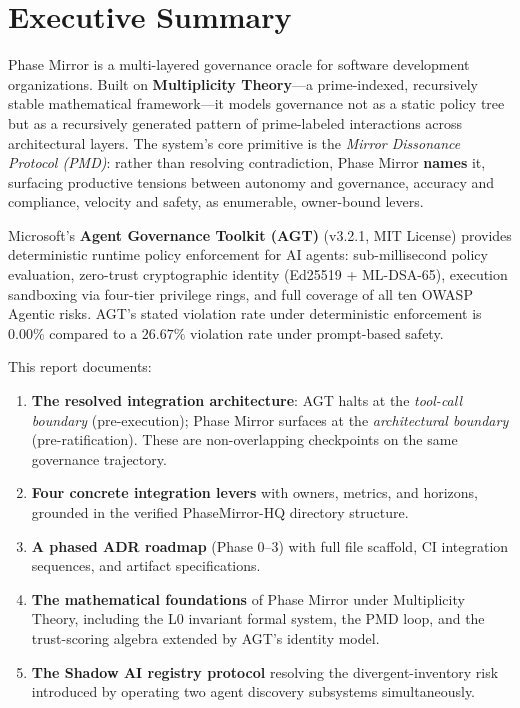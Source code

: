 \documentclass[12pt,a4paper]{article}
\theoremstyle{definition}
\theoremstyle{remark}
\begin{document}
\newpage
\tableofcontents

\section*{Executive Summary}

Phase Mirror is a multi-layered governance oracle for software development
organizations. Built on \textbf{Multiplicity Theory}---a prime-indexed,
recursively stable mathematical framework---it models governance not as a static
policy tree but as a recursively generated pattern of prime-labeled interactions
across architectural layers. The system's core primitive is the \emph{Mirror
Dissonance Protocol (PMD)}: rather than resolving contradiction, Phase Mirror
\textbf{names} it, surfacing productive tensions between autonomy and governance,
accuracy and compliance, velocity and safety, as enumerable, owner-bound levers.

Microsoft's \textbf{Agent Governance Toolkit (AGT)} (v3.2.1, MIT License) provides
deterministic runtime policy enforcement for AI agents: sub-millisecond
policy evaluation, zero-trust cryptographic identity (Ed25519 + ML-DSA-65),
execution sandboxing via four-tier privilege rings, and full coverage of all
ten OWASP Agentic risks. AGT's stated violation rate under deterministic
enforcement is $0.00\%$ compared to a $26.67\%$ violation rate under prompt-based
safety.

This report documents:
\begin{enumerate}[leftmargin=2em]
  \item \textbf{The resolved integration architecture}: AGT halts at the
    \emph{tool-call boundary} (pre-execution); Phase Mirror surfaces at the
    \emph{architectural boundary} (pre-ratification). These are
    non-overlapping checkpoints on the same governance trajectory.
  \item \textbf{Four concrete integration levers} with owners, metrics, and horizons,
    grounded in the verified PhaseMirror-HQ directory structure.
  \item \textbf{A phased ADR roadmap} (Phase 0--3) with full file scaffold, CI
    integration sequences, and artifact specifications.
  \item \textbf{The mathematical foundations} of Phase Mirror under Multiplicity
    Theory, including the L0 invariant formal system, the PMD loop, and the
    trust-scoring algebra extended by AGT's identity model.
  \item \textbf{The Shadow AI registry protocol} resolving the divergent-inventory
    risk introduced by operating two agent discovery subsystems simultaneously.
\end{enumerate}
\end{document}
